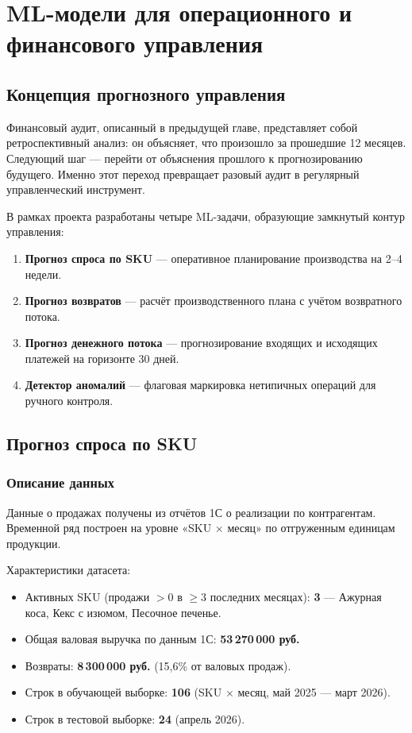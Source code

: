 \chapter{ML-модели для операционного и финансового управления}

\section{Концепция прогнозного управления}

Финансовый аудит, описанный в предыдущей главе, представляет собой ретроспективный анализ: он объясняет, что произошло за прошедшие 12 месяцев. Следующий шаг --- перейти от объяснения прошлого к прогнозированию будущего. Именно этот переход превращает разовый аудит в регулярный управленческий инструмент.

В рамках проекта разработаны четыре ML-задачи, образующие замкнутый контур управления:
\begin{enumerate}
  \item \textbf{Прогноз спроса по SKU} --- оперативное планирование производства на 2--4 недели.
  \item \textbf{Прогноз возвратов} --- расчёт производственного плана с учётом возвратного потока.
  \item \textbf{Прогноз денежного потока} --- прогнозирование входящих и исходящих платежей на горизонте 30 дней.
  \item \textbf{Детектор аномалий} --- флаговая маркировка нетипичных операций для ручного контроля.
\end{enumerate}

\section{Прогноз спроса по SKU}

\subsection{Описание данных}

Данные о продажах получены из отчётов 1С о реализации по контрагентам. Временной ряд построен на уровне «SKU $\times$ месяц» по отгруженным единицам продукции.

Характеристики датасета:
\begin{itemize}
  \item Активных SKU (продажи $> 0$ в $\geq 3$ последних месяцах): \textbf{3} --- Ажурная коса, Кекс с изюмом, Песочное печенье.
  \item Общая валовая выручка по данным 1С: \textbf{53\,270\,000 руб.}
  \item Возвраты: \textbf{8\,300\,000 руб.} (15,6\% от валовых продаж).
  \item Строк в обучающей выборке: \textbf{106} (SKU $\times$ месяц, май 2025 --- март 2026).
  \item Строк в тестовой выборке: \textbf{24} (апрель 2026).
\end{itemize}

